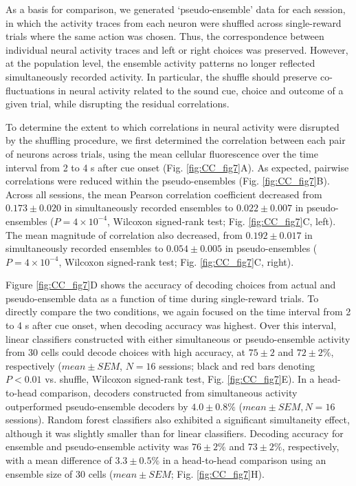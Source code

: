 As a basis for comparison, we generated ‘pseudo-ensemble’ data for each session, in which the activity traces from each neuron were shuffled across single-reward trials where the same action was chosen. Thus, the correspondence between individual neural activity traces and left or right choices was preserved. However, at the population level, the ensemble activity patterns no longer reflected simultaneously recorded activity. In particular, the shuffle should preserve co-fluctuations in neural activity related to the sound cue, choice and outcome of a given trial, while disrupting the residual correlations.

To determine the extent to which correlations in neural activity were disrupted by the shuffling procedure, we first determined the correlation between each pair of neurons across trials, using the mean cellular fluorescence over the time interval from 2 to 4 s after cue onset (Fig. \ref{fig:CC_fig7}A). As expected, pairwise correlations were reduced within the pseudo-ensembles (Fig. \ref{fig:CC_fig7}B). Across all sessions, the mean Pearson correlation coefficient decreased from $0.173 \pm 0.020$ in simultaneously recorded ensembles to $0.022 \pm 0.007$ in pseudo-ensembles ($P = 4 \times 10^{-4}$, Wilcoxon signed-rank test; Fig. \ref{fig:CC_fig7}C, left). The mean magnitude of correlation also decreased, from $0.192 \pm 0.017$ in simultaneously recorded ensembles to $0.054 \pm 0.005$ in pseudo-ensembles ($P = 4 \times 10^{-4}$, Wilcoxon signed-rank test; Fig. \ref{fig:CC_fig7}C, right).



Figure \ref{fig:CC_fig7}D shows the accuracy of decoding choices from actual and pseudo-ensemble data as a function of time during single-reward trials. To directly compare the two conditions, we again focused on the time interval from 2 to 4 s after cue onset, when decoding accuracy was highest. Over this interval, linear classifiers constructed with either simultaneous or pseudo-ensemble activity from 30 cells could decode choices with high accuracy, at $75 \pm 2$ and $72 \pm 2\%$, respectively ($mean \pm SEM$, $N = 16$ sessions; black and red bars denoting $P < 0.01$ vs. shuffle, Wilcoxon signed-rank test, Fig. \ref{fig:CC_fig7}E). In a head-to-head comparison, decoders constructed from simultaneous activity outperformed pseudo-ensemble decoders by $4.0 \pm 0.8\%$ ($mean \pm SEM, N = 16$ sessions). Random forest classifiers also exhibited a significant simultaneity effect, although it was slightly smaller than for linear classifiers. Decoding accuracy for ensemble and pseudo-ensemble activity was $76 \pm 2\%$ and $73 \pm 2\%$, respectively, with a mean difference of $3.3 \pm 0.5\%$ in a head-to-head comparison using an ensemble size of 30 cells ($mean \pm SEM$; Fig. \ref{fig:CC_fig7}H).

